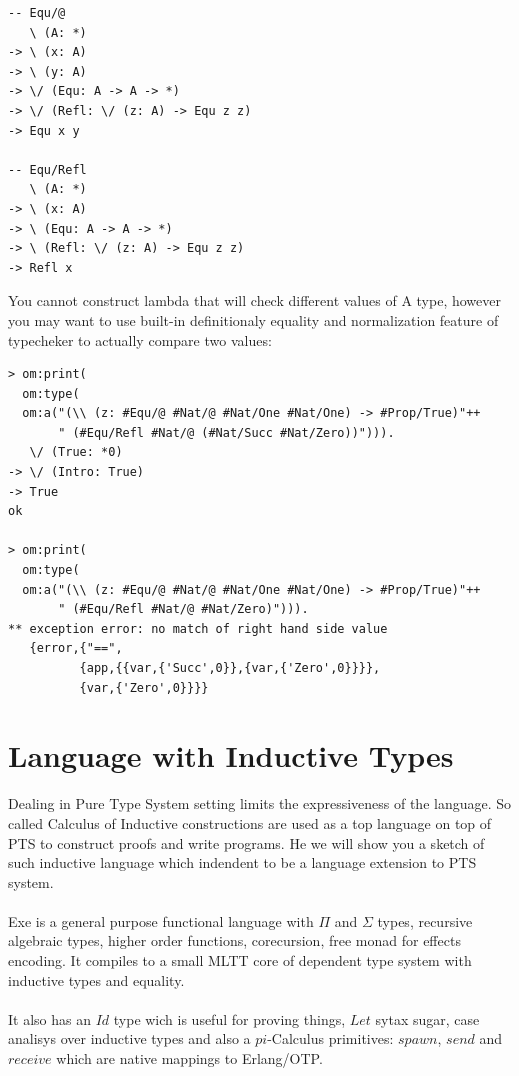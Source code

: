 \documentclass[11pt,oneside]{article}
\begin{document}
\begin{lstlisting}[mathescape=true]
-- Equ/@
   \ (A: *)
-> \ (x: A)
-> \ (y: A)
-> \/ (Equ: A -> A -> *)
-> \/ (Refl: \/ (z: A) -> Equ z z)
-> Equ x y

-- Equ/Refl
   \ (A: *)
-> \ (x: A)
-> \ (Equ: A -> A -> *)
-> \ (Refl: \/ (z: A) -> Equ z z)
-> Refl x
\end{lstlisting}

You cannot construct lambda that will check different values of A type,
however you may want to use built-in definitionaly equality and
normalization feature of typecheker to actually compare two values:

\begin{lstlisting}[mathescape=true]
> om:print(
  om:type(
  om:a("(\\ (z: #Equ/@ #Nat/@ #Nat/One #Nat/One) -> #Prop/True)"++
       " (#Equ/Refl #Nat/@ (#Nat/Succ #Nat/Zero))"))).
   \/ (True: *0)
-> \/ (Intro: True)
-> True
ok

> om:print(
  om:type(
  om:a("(\\ (z: #Equ/@ #Nat/@ #Nat/One #Nat/One) -> #Prop/True)"++
       " (#Equ/Refl #Nat/@ #Nat/Zero)"))).
** exception error: no match of right hand side value
   {error,{"==",
          {app,{{var,{'Succ',0}},{var,{'Zero',0}}}},
          {var,{'Zero',0}}}}
\end{lstlisting}

\newpage
\section{Language with Inductive Types}

Dealing in Pure Type System setting limits the expressiveness of the language.
So called Calculus of Inductive constructions are used as a top language on top of
PTS to construct proofs and write programs. He we will show you a sketch of such
inductive language which indendent to be a language extension to PTS system.

\paragraph{}
Exe is a general purpose functional language with $\Pi$ and $\Sigma$ types,
recursive algebraic types, higher order functions,
corecursion, free monad for effects encoding. It compiles
to a small MLTT core of dependent type system with inductive types and equality.

\paragraph{}
It also has an $Id$ type wich is useful for proving things, $Let$ sytax sugar,
case analisys over inductive types and also a $pi$-Calculus primitives:
$spawn$, $send$ and $receive$ which are native mappings to Erlang/OTP.
\end{document}
